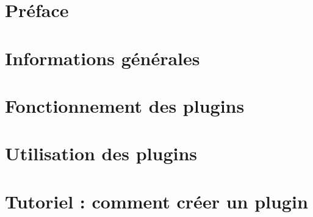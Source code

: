 \documentclass[a4paper]{report}
\begin{document}



\tableofcontents


\chapter*{Préface}



\chapter{Informations générales}



\chapter{Fonctionnement des plugins}



\chapter{Utilisation des plugins}



\chapter{Tutoriel : comment créer un plugin}

\end{document}
